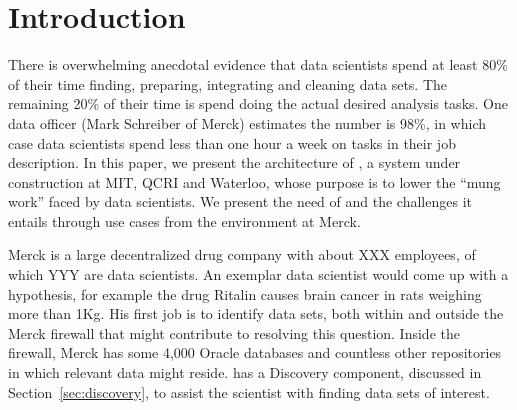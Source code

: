 \section{Introduction}
\label{introduction}

There is overwhelming anecdotal evidence that data scientists spend at least
80\% of their time finding, preparing, integrating and cleaning data sets.
The remaining 20\% of their time is spend doing the actual desired analysis
tasks.
One data officer (Mark Schreiber of Merck) estimates the number is 98\%, in which case data
scientists spend less than one hour a week on tasks in their job description.
%
In this paper, we present the architecture of \dcv, a system under construction
at MIT, QCRI and Waterloo, whose purpose is to lower the ``mung work''  faced by
data scientists.  We present the need of \dcv and the challenges it entails
through use cases from the environment at Merck.

%
%

Merck is a large decentralized drug company with about XXX employees, of which
YYY are data scientists.  An exemplar data scientist would come up with a
hypothesis, for example the drug Ritalin causes brain cancer in rats weighing
more than 1Kg.  His first job is to identify data sets, both within and outside the Merck
firewall that might contribute to resolving this question.  Inside
the firewall, Merck has some 4,000 Oracle databases and countless other
repositories in which relevant data might reside.  \dcv has a
Discovery component, discussed in Section~\ref{sec:discovery}, 
to assist the scientist with finding data sets of interest.

